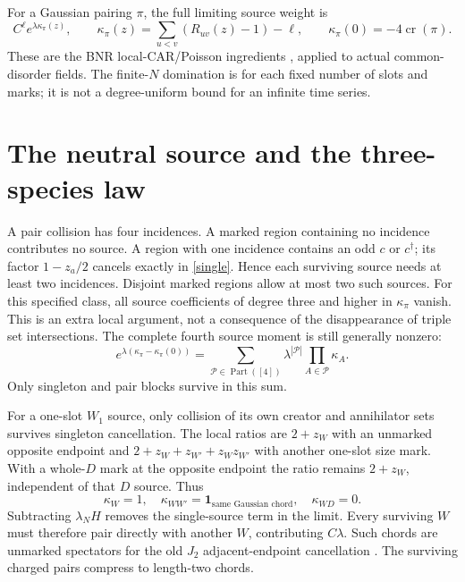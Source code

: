 \documentclass[11pt]{article}
\begin{document}
For a Gaussian pairing $\pi$, the full limiting source weight is
\begin{equation}
 C^\ell e^{\lambda\kappa_\pi(z)},\qquad
 \kappa_\pi(z)=\sum_{u<v}(R_{uv}(z)-1)-\ell,
 \qquad \kappa_\pi(0)=-4\operatorname{cr}(\pi).\label{kappa}
\end{equation}
These are the BNR local-CAR/Poisson ingredients \cite{BNR}, applied
to actual common-disorder fields. The finite-$N$ domination is for
each fixed number of slots and marks; it is not a degree-uniform
bound for an infinite time series.

\newpage
\section{The neutral source and the three-species law}
A pair collision has four incidences. A marked region containing no
incidence contributes no source. A region with one incidence contains
an odd $c$ or $c^\dagger$; its factor $1-z_a/2$ cancels exactly in
\eqref{single}. Hence each surviving source needs at least two
incidences. Disjoint marked regions allow at most two such sources.
For this specified class, all source coefficients of degree three
and higher in $\kappa_\pi$ vanish. This is an extra local argument,
not a consequence of the disappearance of triple set intersections.
The complete fourth source moment is still generally nonzero:
\begin{equation}
 [z_1z_2z_3z_4]e^{\lambda(\kappa_\pi-\kappa_\pi(0))}
 =\sum_{\mathcal P\in\operatorname{Part}([4])}
       \lambda^{|\mathcal P|}\prod_{A\in\mathcal P}\kappa_A.
\end{equation}
Only singleton and pair blocks survive in this sum.

For a one-slot $W_1$ source, only collision of its own creator and
annihilator sets survives singleton cancellation. The local ratios
are $2+z_W$ with an unmarked opposite endpoint and
$2+z_W+z_{W'}+z_Wz_{W'}$ with another one-slot size mark.
With a whole-$D$ mark at the opposite endpoint the ratio remains
$2+z_W$, independent of that $D$ source. Thus
\begin{equation}
 \kappa_W=1,\quad
 \kappa_{WW'}=\mathbf1_{\text{same Gaussian chord}},\quad
 \kappa_{WD}=0.
\end{equation}
Subtracting $\lambda_NH$ removes the single-source term in the
limit. Every surviving $W$ must therefore pair directly with another
$W$, contributing $C\lambda$. Such chords are unmarked spectators
for the old $J_2$ adjacent-endpoint cancellation \cite{Old}. The
surviving charged pairs compress to length-two chords.
\end{document}
